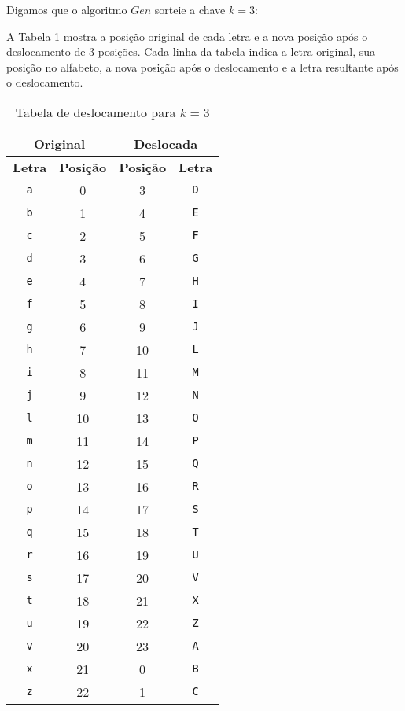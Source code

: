 \begin{example}
  Digamos que o algoritmo $Gen$ sorteie a chave $k = 3$:

  A Tabela \ref{table:cesar_shift} mostra a posição original de cada letra e a nova posição após o deslocamento de 3 posições.
  Cada linha da tabela indica a letra original, sua posição no alfabeto, a nova posição após o deslocamento e a letra resultante após o deslocamento.

  
  \begin{table}[h!]
    \centering
    \begin{tabular}{|c|c|c|c|}
      \hline
      \multicolumn{2}{|c|}{\textbf{Original}} & \multicolumn{2}{c|}{\textbf{Deslocada}} \\
      \hline
      \textbf{Letra} & \textbf{Posição} & \textbf{Posição} & \textbf{Letra} \\
      \hline
      \texttt{a} & 0 & 3 & \texttt{D} \\
      \hline
      \texttt{b} & 1 & 4 & \texttt{E} \\
      \hline
      \texttt{c} & 2 & 5 & \texttt{F} \\
      \hline
      \texttt{d} & 3 & 6 & \texttt{G} \\
      \hline
      \texttt{e} & 4 & 7 & \texttt{H} \\
      \hline
      \texttt{f} & 5 & 8 & \texttt{I} \\
      \hline
      \texttt{g} & 6 & 9 & \texttt{J} \\
      \hline
      \texttt{h} & 7 & 10 & \texttt{L} \\
      \hline
      \texttt{i} & 8 & 11 & \texttt{M} \\
      \hline
      \texttt{j} & 9 & 12 & \texttt{N} \\
      \hline
      \texttt{l} & 10 & 13 & \texttt{O} \\
      \hline
      \texttt{m} & 11 & 14 & \texttt{P} \\
      \hline
      \texttt{n} & 12 & 15 & \texttt{Q} \\
      \hline
      \texttt{o} & 13 & 16 & \texttt{R} \\
      \hline
      \texttt{p} & 14 & 17 & \texttt{S} \\
      \hline
      \texttt{q} & 15 & 18 & \texttt{T} \\
      \hline
      \texttt{r} & 16 & 19 & \texttt{U} \\
      \hline
      \texttt{s} & 17 & 20 & \texttt{V} \\
      \hline
      \texttt{t} & 18 & 21 & \texttt{X} \\
      \hline
      \texttt{u} & 19 & 22 & \texttt{Z} \\
      \hline
      \texttt{v} & 20 & 23 & \texttt{A} \\
      \hline
      \texttt{x} & 21 & 0 & \texttt{B} \\
      \hline
      \texttt{z} & 22 & 1 & \texttt{C} \\
      \hline
    \end{tabular}
    \caption{Tabela de deslocamento para $k=3$}
    \label{table:cesar_shift}
  \end{table}


\end{example}
